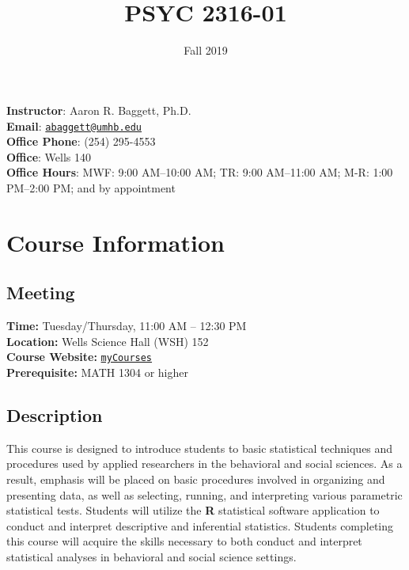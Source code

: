 \documentclass[article]{article}
\title{
\HRule \\
PSYC 2316-01 \\ \sc{Statistics for the Social Sciences\\ }
\HRule
}
\author{Fall 2019}
\date{}
\begin{document}


\maketitle


\textbf{Instructor}: Aaron R. Baggett, Ph.D.\\
\textbf{Email}: \texttt{\href{mailto:abaggett@umhb.edu}{abaggett@umhb.edu}}\\
\textbf{Office Phone}: (254) 295-4553\\
\textbf{Office}: Wells 140\\
\textbf{Office Hours}: MWF: 9:00 AM--10:00 AM; TR: 9:00 AM--11:00 AM; M-R: 1:00 PM--2:00 PM; and by appointment

\section{Course Information}
\subsection{Meeting}
\textbf{Time:} Tuesday/Thursday, 11:00 AM -- 12:30 PM\\
\textbf{Location:} Wells Science Hall (WSH) 152\\
{\bf{Course Website:}} \texttt{\href{https://mycourses.umhb.edu/courses/20947}{myCourses}}\\
{\bf{Prerequisite:}} MATH 1304 or higher

\subsection{Description}
This course is designed to introduce students to basic statistical techniques and procedures used by applied researchers in the behavioral and social sciences. As a result, emphasis will be placed on basic procedures involved in organizing and presenting data, as well as selecting, running, and interpreting various parametric statistical tests. Students will utilize the \textbf{\textsf{R}} statistical software application to conduct and interpret descriptive and inferential statistics. Students completing this course will acquire the skills necessary to both conduct and interpret statistical analyses in behavioral and social science settings.
\end{document}
